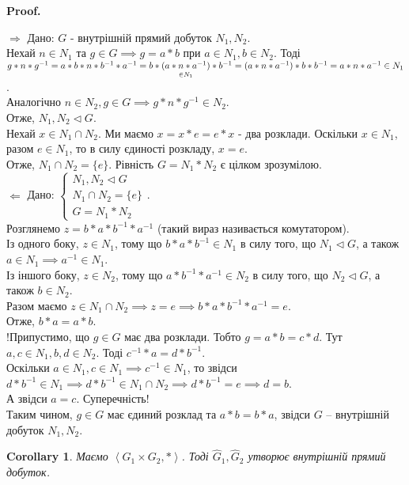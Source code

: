 \documentclass[a4paper, 10pt]{article}
\makeatletter
\def\rightproof{$\boxed{\Rightarrow}$ }
\def\leftproof{$\boxed{\Leftarrow}$ }
\theoremstyle{theoremdd}
\theoremstyle{theoremdd}
\theoremstyle{theoremdd}
\theoremstyle{theoremdd}
\theoremstyle{theoremdd}
\theoremstyle{theoremdd}
\theoremstyle{theoremdd}
\theoremstyle{theoremdd}
\theoremstyle{theoremdd}
\theoremstyle{theoremdd}
\theoremstyle{theoremdd}
\theoremstyle{theoremdd}
\theoremstyle{theoremdd}
\theoremstyle{theoremdd}
\newtheorem{corollary}[theorem]{Corollary}
\theoremstyle{theoremdd}
\renewenvironment{proof}[1][Proof.\\]{\par
\pushQED{\hfill \qed}%
\normalfont \topsep6\p@\@plus6\p@\relax
\trivlist
\item\relax
{\bfseries
#1\@addpunct{.}}\hspace\labelsep\ignorespaces
}{%
\popQED\endtrivlist\@endpefalse
}
\makeatother
\begin{document}
\begin{proof}
\rightproof Дано: $G$ - внутрішній прямий добуток $N_1,N_2$.\\
Нехай $n \in N_1$ та $g \in G \implies g = a*b$ при $a \in N_1,b \in N_2$. Тоді\\
$g*n*g^{-1} = a*b*n*b^{-1}*a^{-1} = b*\underset{\in N_1}{(a*n*a^{-1})}*b^{-1} = (a*n*a^{-1})*b*b^{-1} \\ = a*n*a^{-1} \in N_1$.\\
Аналогічно $n \in N_2, g \in G \implies g*n*g^{-1} \in N_2$.\\
Отже, $N_1,N_2 \triangleleft G$.\\
Нехай $x \in N_1 \cap N_2$. Ми маємо $x = x*e = e*x$ - два розклади. Оскільки $x \in N_1$, разом $e \in N_1$, то в силу єдиності розкладу, $x = e$. \\
Отже, $N_1 \cap N_2 = \{e\}$. Рівність $G = N_1*N_2$ є цілком зрозумілою.
\bigskip \\
\leftproof Дано: $\begin{cases} N_1,N_2 \triangleleft G \\ N_1 \cap N_2 = \{e\} \\ G = N_1*N_2 \end{cases}$.\\
Розглянемо $z = b*a*b^{-1}*a^{-1}$ (такий вираз називається комутатором).\\
Із одного боку, $z \in N_1$, тому що $b*a*b^{-1} \in N_1$ в силу того, що $N_1 \triangleleft G$, а також $a \in N_1 \implies a^{-1} \in N_1$.\\
Із іншого боку, $z \in N_2$, тому що $a*b^{-1}*a^{-1} \in N_2$ в силу того, що $N_2 \triangleleft G$, а також $b \in N_2$.\\
Разом маємо $z \in N_1 \cap N_2 \implies z = e \implies b*a*b^{-1}*a^{-1} = e$.\\
Отже, $b*a = a*b$.\\
!Припустимо, що $g \in G$ має два розклади. Тобто $g = a*b = c*d$. Тут $a,c \in N_1, b,d \in N_2$. Тоді $c^{-1}*a=d*b^{-1}$.\\
Оскільки $a \in N_1, c \in N_1 \implies c^{-1} \in N_1$, то звідси $d*b^{-1} \in N_1 \implies d*b^{-1} \in N_1 \cap N_2 \implies d*b^{-1} = e \implies d = b$.\\
А звідси $a = c$. Суперечність!\\
Таким чином, $g \in G$ має єдиний розклад та $a*b=b*a$, звідси $G$ -- внутрішній добуток $N_1,N_2$.
\end{proof}

\begin{corollary}
Маємо $\left< G_1 \times G_2, * \right>$. Тоді $\hat{G}_1, \hat{G}_2$ утворює внутрішній прямий добуток.
\end{corollary}
\end{document}
